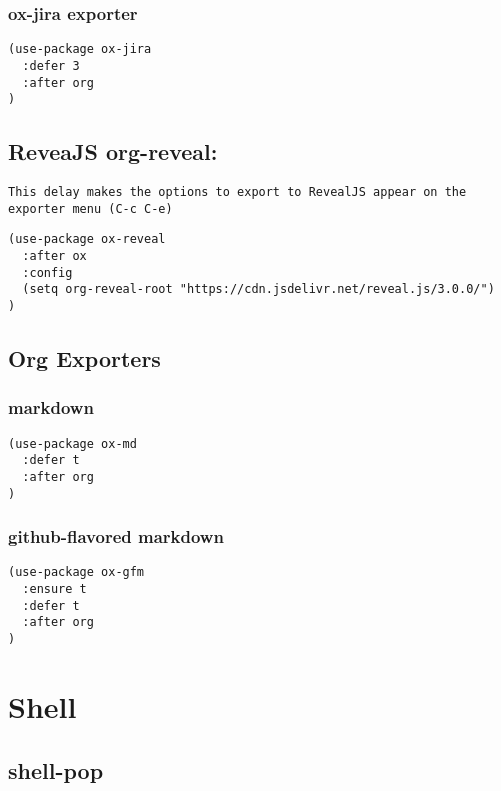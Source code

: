 \documentclass[11pt]{article}
\begin{document}
\subsubsection*{ox-jira exporter}
\label{sec:org1319f35}
\begin{verbatim}
(use-package ox-jira
  :defer 3
  :after org
)
\end{verbatim}


\subsection*{ReveaJS org-reveal:}
\label{sec:orgec86ce8}

\begin{verbatim}
This delay makes the options to export to RevealJS appear on the exporter menu (C-c C-e)
\end{verbatim}


\begin{verbatim}
(use-package ox-reveal
  :after ox
  :config
  (setq org-reveal-root "https://cdn.jsdelivr.net/reveal.js/3.0.0/")
)
\end{verbatim}

\subsection*{Org Exporters}
\label{sec:orgc150b4a}

\subsubsection*{markdown}
\label{sec:org6f812fd}
\begin{verbatim}
(use-package ox-md
  :defer t
  :after org
)
\end{verbatim}

\subsubsection*{github-flavored markdown}
\label{sec:orged70e2b}
\begin{verbatim}
(use-package ox-gfm
  :ensure t
  :defer t
  :after org
)
\end{verbatim}

\section*{Shell}
\label{sec:orgdb4ff86}

\subsection*{shell-pop}
\label{sec:org6c1f33d}
\end{document}
